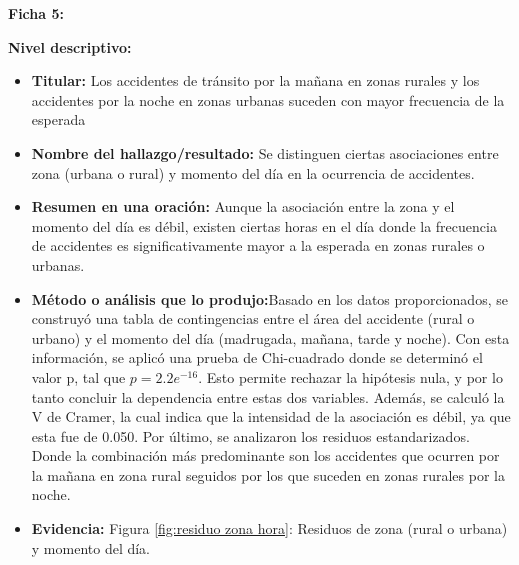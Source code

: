 \documentclass[12pt]{article}
\begin{document}
\textbf{Ficha 5:}

\textbf{Nivel descriptivo:}
\begin{itemize}
  \item \textbf{Titular:} Los accidentes de tránsito por la mañana en zonas rurales 
  y los accidentes por la noche en zonas urbanas suceden con mayor frecuencia de la esperada

  \item \textbf{Nombre del hallazgo/resultado:} Se distinguen ciertas asociaciones 
  entre zona (urbana o rural) y momento del día en la ocurrencia de accidentes. 
  
  \item \textbf{Resumen en una oración:} Aunque la asociación entre la zona y el momento 
  del día es débil, existen ciertas horas en el día donde la frecuencia de accidentes 
  es significativamente mayor a la esperada en zonas rurales o urbanas.
  
  \item \textbf{Método o análisis que lo produjo:}Basado en los datos proporcionados, 
  se construyó una tabla de contingencias entre el área del accidente (rural o urbano) 
  y el momento del día (madrugada, mañana, tarde y noche). Con esta información, 
  se aplicó una prueba de Chi-cuadrado donde se determinó el valor p, tal que 
  $p=2.2e^{-16}$. Esto permite rechazar la hipótesis nula, y por lo tanto concluir 
  la dependencia entre estas dos variables. Además, se calculó la V de Cramer, 
  la cual indica que la intensidad de la asociación es débil, ya que esta fue de 
  0.050. Por último, se analizaron los residuos estandarizados. Donde la combinación 
  más predominante son los accidentes que ocurren por la mañana en zona rural seguidos 
  por los que suceden en zonas rurales por la noche. 

  \item \textbf{Evidencia:} Figura \ref{fig:residuo zona hora}: Residuos de zona 
  (rural o urbana) y momento del día. \\
\end{itemize}
\end{document}
